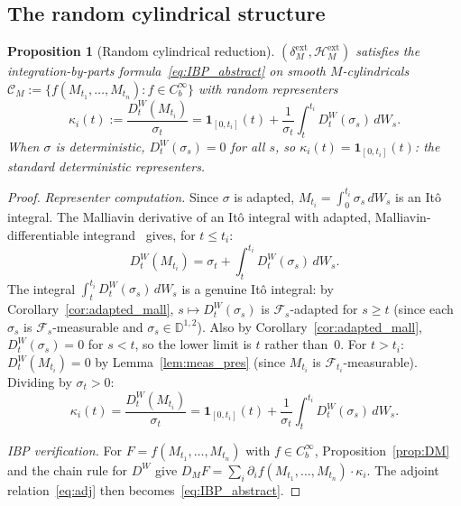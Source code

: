 \documentclass[11pt,a4paper]{article}
\theoremstyle{plain}
\newtheorem{proposition}[theorem]{Proposition}
\theoremstyle{definition}
\theoremstyle{remark}
\newcommand{\HM}{\mathcal{H}_M}
\begin{document}
\subsection{The random cylindrical structure}

\begin{proposition}[Random cylindrical reduction]\label{prop:rand_cyl}
$(\delta_M^{\mathrm{ext}}, \HM^{\mathrm{ext}})$ satisfies the integration-by-parts formula~\eqref{eq:IBP_abstract} on smooth $M$-cylindricals $\mathcal{C}_M := \{f(M_{t_1},\ldots,M_{t_n}) : f \in C_b^\infty\}$ with random representers
\begin{equation}\label{eq:kappa}
\kappa_i(t) := \frac{D_t^W(M_{t_i})}{\sigma_t} = \mathbf{1}_{[0,t_i]}(t) + \frac{1}{\sigma_t}\int_t^{t_i} D_t^W(\sigma_s)\,dW_s.
\end{equation}
When $\sigma$ is deterministic, $D_t^W(\sigma_s) = 0$ for all $s$, so $\kappa_i(t) = \mathbf{1}_{[0,t_i]}(t)$: the standard deterministic representers.
\end{proposition}

\begin{proof}
\emph{Representer computation.} Since $\sigma$ is adapted, $M_{t_i} = \int_0^{t_i}\sigma_s\,dW_s$ is an It\^o integral. The Malliavin derivative of an It\^o integral with adapted, Malliavin-differentiable integrand~\cite[Proposition 1.3.3]{Nualart2006} gives, for $t \le t_i$:
\[
D_t^W(M_{t_i}) = \sigma_t + \int_t^{t_i} D_t^W(\sigma_s)\,dW_s.
\]
The integral $\int_t^{t_i} D_t^W(\sigma_s)\,dW_s$ is a genuine It\^o integral: by Corollary~\ref{cor:adapted_mall}, $s \mapsto D_t^W(\sigma_s)$ is $\mathcal{F}_s$-adapted for $s \ge t$ (since each $\sigma_s$ is $\mathcal{F}_s$-measurable and $\sigma_s \in \mathbb{D}^{1,2}$). Also by Corollary~\ref{cor:adapted_mall}, $D_t^W(\sigma_s) = 0$ for $s < t$, so the lower limit is $t$ rather than~$0$. For $t > t_i$: $D_t^W(M_{t_i}) = 0$ by Lemma~\ref{lem:meas_pres} (since $M_{t_i}$ is $\mathcal{F}_{t_i}$-measurable). Dividing by $\sigma_t > 0$:
\[
\kappa_i(t) = \frac{D_t^W(M_{t_i})}{\sigma_t} = \mathbf{1}_{[0,t_i]}(t) + \frac{1}{\sigma_t}\int_t^{t_i} D_t^W(\sigma_s)\,dW_s.
\]

\emph{IBP verification.} For $F = f(M_{t_1}, \ldots, M_{t_n})$ with $f \in C_b^\infty$, Proposition~\ref{prop:DM} and the chain rule for $D^W$ give $D_M F = \sum_i \partial_i f(M_{t_1}, \ldots, M_{t_n}) \cdot \kappa_i$. The adjoint relation~\eqref{eq:adj} then becomes~\eqref{eq:IBP_abstract}.
\end{proof}
\end{document}

